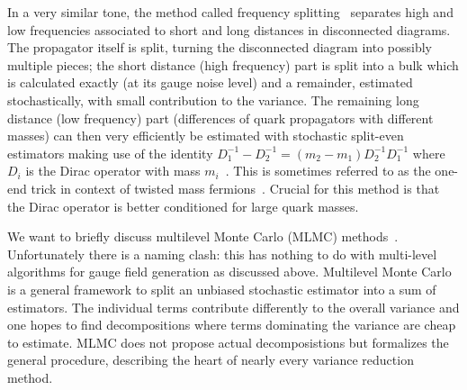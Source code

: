 In a very similar tone, the method called frequency splitting~\cite{Giusti:2019kff,Giusti:2020dtz} separates high and low frequencies associated to short and long distances in disconnected diagrams.
The propagator itself is split, turning the disconnected diagram into possibly multiple pieces; the short distance (high frequency) part is split into a bulk which is calculated exactly (\ie at its gauge noise level) and a remainder, estimated stochastically, with small contribution to the variance.
The remaining long distance (low frequency) part (differences of quark propagators with different masses) can then very efficiently be estimated with stochastic split-even estimators making use of the identity $D_1^{-1} - D_2^{-1} = (m_2 - m_1) D_2^{-1} D_1^{-1}$ where $D_i$ is the Dirac operator with mass $m_i$~\cite{Whyte:2022vrk}.
This is sometimes referred to as the one-end trick in context of twisted mass fermions~\cite{ETM:2008zte,PhysRevD.73.074506,PhysRevD.59.074503}.
Crucial for this method is that the Dirac operator is better conditioned for large quark masses.


We want to briefly discuss multilevel Monte Carlo (MLMC) methods~\cite{giles2008,Giles_2015}.
Unfortunately there is a naming clash: this has nothing to do with multi-level algorithms for gauge field generation as discussed above.
Multilevel Monte Carlo is a general framework to split an unbiased stochastic estimator into a sum of estimators.
The individual terms contribute differently to the overall variance and one hopes to find decompositions where terms dominating the variance are cheap to estimate.
MLMC does not propose actual decomposistions but formalizes the general procedure, describing the heart of nearly every variance reduction method.

